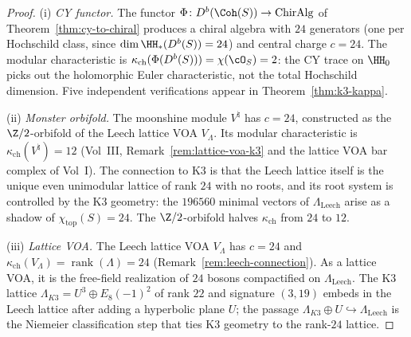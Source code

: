 \begin{proof}
(i) \emph{CY functor.} The functor
$\Phi \colon D^b(\Coh(S)) \to \mathrm{ChirAlg}$ of Theorem~\ref{thm:cy-to-chiral}
produces a chiral algebra with $24$ generators (one per Hochschild class, since
$\dim \HH_*(D^b(S)) = 24$) and central charge $c = 24$.
The modular characteristic is $\kappa_{\mathrm{ch}}(\Phi(D^b(S))) = \chi(\cO_S) = 2$:
the CY trace on $\HH_0$ picks out the holomorphic Euler characteristic, not the
total Hochschild dimension. Five independent verifications appear in
Theorem~\ref{thm:k3-kappa}.

(ii) \emph{Monster orbifold.} The moonshine module $V^\natural$ has $c = 24$,
constructed as the $\Z/2$-orbifold of the Leech lattice VOA $V_\Lambda$.
Its modular characteristic is $\kappa_{\mathrm{ch}}(V^\natural) = 12$
(Vol~III, Remark~\ref{rem:lattice-voa-k3} and the lattice VOA bar complex of
Vol~I). The connection to K3 is that the Leech lattice itself is the unique
even unimodular lattice of rank $24$ with no roots, and its root system is
controlled by the K3 geometry: the $196560$ minimal vectors of $\Lambda_{\mathrm{Leech}}$
arise as a shadow of $\chi_{\mathrm{top}}(S) = 24$. The $\Z/2$-orbifold halves
$\kappa_{\mathrm{ch}}$ from $24$ to $12$.

(iii) \emph{Lattice VOA.} The Leech lattice VOA $V_\Lambda$ has $c = 24$ and
$\kappa_{\mathrm{ch}}(V_\Lambda) = \operatorname{rank}(\Lambda) = 24$
(Remark~\ref{rem:leech-connection}). As a lattice VOA, it is the free-field
realization of $24$ bosons compactified on $\Lambda_{\mathrm{Leech}}$. The K3
lattice $\Lambda_{K3} = U^3 \oplus E_8(-1)^2$ of rank $22$ and signature $(3,19)$
embeds in the Leech lattice after adding a hyperbolic plane $U$; the passage
$\Lambda_{K3} \oplus U \hookrightarrow \Lambda_{\mathrm{Leech}}$ is the Niemeier
classification step that ties K3 geometry to the rank-$24$ lattice.
\end{proof}

